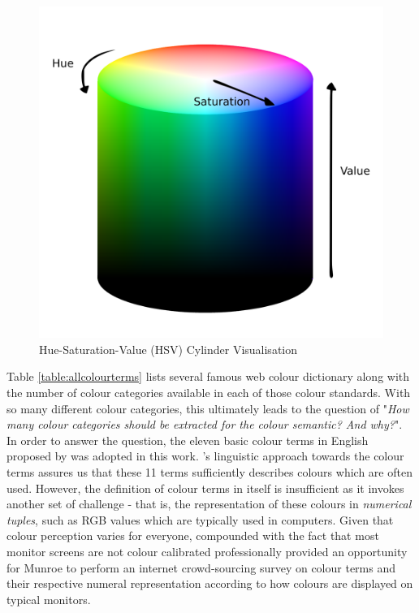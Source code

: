 \begin{figure}[hbt!]\centering
\includegraphics[width=.5\textwidth]{image/general/HSV.png}
\caption{Hue-Saturation-Value (HSV) Cylinder Visualisation}
\label{fig:hsvcylinder}
\end{figure}

Table \ref{table:allcolourterms} lists several famous web colour dictionary along with the number of colour categories available in each of those colour standards. With so many different colour categories, this ultimately leads to the question of "\textit{How many colour categories should be extracted for the colour semantic? And why?}".
In order to answer the question, the eleven basic colour terms in English proposed by \cite{berlinandkay} was adopted in this work.
's linguistic approach towards the colour terms assures us that these 11 terms sufficiently describes colours which are often used.
However, the definition of colour terms in itself is insufficient as it invokes another set of challenge - that is, the representation of these colours in \textit{numerical tuples}, such as RGB values which are typically used in computers.
Given that colour perception varies for everyone, compounded with the fact that most monitor screens are not colour calibrated professionally provided an opportunity for Munroe \cite{munroe2010color} to perform an internet crowd-sourcing survey on colour terms and their respective numeral representation according to how colours are displayed on typical monitors.

